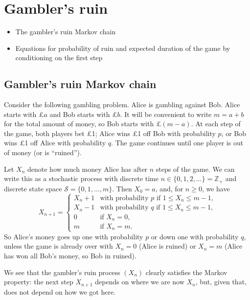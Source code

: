 \documentclass[
  a4paper,
]{article}
\providecommand{\tightlist}{%
  \setlength{\itemsep}{0pt}\setlength{\parskip}{0pt}}
\theoremstyle{definition}
\theoremstyle{definition}
\theoremstyle{definition}
\theoremstyle{remark}
\begin{document}
\hypertarget{S03-gamblers-ruin}{%
\section{Gambler's ruin}\label{S03-gamblers-ruin}}

\begin{itemize}
\tightlist
\item
  The gambler's ruin Markov chain
\item
  Equations for probability of ruin and expected duration of the game by conditioning on the first step
\end{itemize}

\hypertarget{ruin-chain}{%
\subsection{Gambler's ruin Markov chain}\label{ruin-chain}}

Consider the following gambling problem. Alice is gambling against Bob. Alice starts with £\(a\) and Bob starts with £\(b\). It will be convenient to write \(m = a + b\) for the total amount of money, so Bob starts with £\((m-a)\). At each step of the game, both players bet £1; Alice wins £1 off Bob with probability \(p\), or Bob wins £1 off Alice with probability \(q\). The game continues until one player is out of money (or is ``ruined'').

Let \(X_n\) denote how much money Alice has after \(n\) steps of the game. We can write this as a stochastic process with discrete time \(n \in \{0,1,2,\dots\} = \mathbb Z_+\) and discrete state space \(\mathcal S = \{0,1,\dots,m\}\). Then \(X_0 = a\), and, for \(n \geq 0\), we have
\[ X_{n+1} = \begin{cases} X_n + 1 & \text{with probability $p$ if $1\leq X_n \leq m-1$,} \\
                           X_n - 1 & \text{with probability $q$ if $1\leq X_n \leq m-1$,} \\
                           0       & \text{if $X_n = 0$,} \\
                           m       & \text{if $X_n = m$.} \end{cases} \]
So Alice's money goes up one with probability \(p\) or down one with probability \(q\), unless the game is already over with \(X_n = 0\) (Alice is ruined) or \(X_n = m\) (Alice has won all Bob's money, so Bob in ruined).

We see that the gambler's ruin process \((X_n)\) clearly satisfies the Markov property: the next step \(X_{n+1}\) depends on where we are now \(X_n\), but, given that, does not depend on how we got here.
\end{document}

